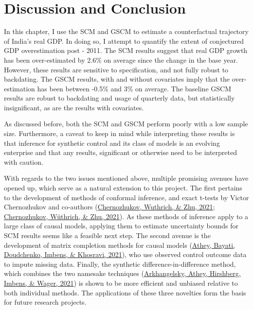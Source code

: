 \documentclass[12pt,nobind, a4paper]{reedthesis}
\begin{document}
 \hypertarget{conc3}{%
 \section{Discussion and Conclusion}\label{conc3}}

 In this chapter, I use the SCM and GSCM to estimate a counterfactual trajectory of India's real GDP. In doing so, I attempt to quantify the extent of conjectured GDP overestimation post - 2011. The SCM results suggest that real GDP growth has been over-estimated by 2.6\% on average since the change in the base year. However, these results are sensitive to specification, and not fully robust to backdating. The GSCM results, with and without covariates imply that the over-estimation has been between -0.5\% and 3\% on average. The baseline GSCM results are robust to backdating and usage of quarterly data, but statistically insignificant, as are the results with covariates.
 \linebreak

 As discussed before, both the SCM and GSCM perform poorly with a low sample size. Furthermore, a caveat to keep in mind while interpreting these results is that inference for synthetic control and its class of models is an evolving enterprise and that any results, significant or otherwise need to be interpreted with caution.
 \linebreak

 With regards to the two issues mentioned above, multiple promising avenues have opened up, which serve as a natural extension to this project. The first pertains to the development of methods of conformal inference, and exact t-tests by Victor Chernozhukov and co-authors (\protect\hyperlink{ref-chernozhukov_t-test_2021}{Chernozhukov, Wuthrich, \& Zhu, 2021}; \protect\hyperlink{ref-chernozhukov_exact_2021}{Chernozhukov, Wüthrich, \& Zhu, 2021}). As these methods of inference apply to a large class of causal models, applying them to estimate uncertainty bounds for SCM results seems like a feasible next step. The second avenue is the development of matrix completion methods for causal models (\protect\hyperlink{ref-athey_matrix_2021}{Athey, Bayati, Doudchenko, Imbens, \& Khosravi, 2021}), who use observed control outcome data to impute missing data. Finally, the synthetic difference-in-difference method, which combines the two namesake techniques (\protect\hyperlink{ref-arkhangelsky_synthetic_2021}{Arkhangelsky, Athey, Hirshberg, Imbens, \& Wager, 2021}) is shown to be more efficient and unbiased relative to both individual methods. The applications of these three novelties form the basis for future research projects.
\end{document}
